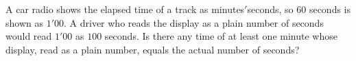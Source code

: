 A car radio shows the elapsed time of a track as minutes$'$seconds, so $60$ seconds is shown as $1'00$. A driver who reads the display as a plain number of seconds would read $1'00$ as $100$ seconds. Is there any time of at least one minute whose display, read as a plain number, equals the actual number of seconds?
